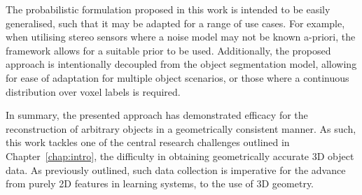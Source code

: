 The probabilistic formulation proposed in this work is intended to be easily generalised, such that 
it may be adapted for a range of use cases. For example, when utilising stereo sensors where a noise 
model may not be known a-priori, the framework allows for a suitable prior to be used. Additionally, 
the proposed approach is intentionally decoupled from the object segmentation model, allowing for 
ease of adaptation for multiple object scenarios, or those where a continuous distribution over voxel 
labels is required.

In summary, the presented approach has demonstrated efficacy for the reconstruction of arbitrary 
objects in a geometrically consistent manner. As such, this work tackles one of the central research 
challenges outlined in Chapter~\ref{chap:intro}, the difficulty in obtaining geometrically accurate 
3D object data. As previously outlined, such data collection is imperative for the advance from purely 
2D features in learning systems, to the use of 3D geometry.